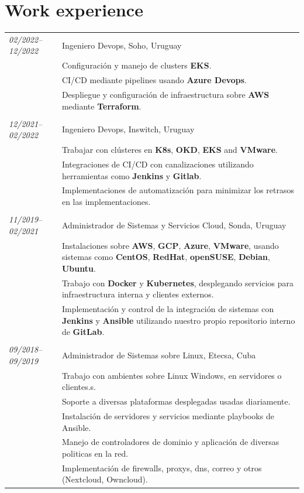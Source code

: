 \documentclass[a4paper,12pt]{article}
\begin{document}
\section{Work experience}
\justify
\begin{tabular}{p{2.9cm}| p{16cm}}
\emph{02/2022–12/2022} & Ingeniero Devops, Soho, Uruguay \\
\textsc{}&\footnotesize{Configuración y manejo de clusters \textbf{EKS}.}\\
\textsc{}&\footnotesize{CI/CD mediante pipelines usando \textbf{Azure Devops}.}\\
\textsc{}&\footnotesize{Despliegue y configuración de infraestructura sobre \textbf{AWS} mediante \textbf{Terraform}.}\\

\multicolumn{2}{c}{} \\  
\emph{12/2021–02/2022} & Ingeniero Devops, Inswitch, Uruguay \\
\textsc{}&\footnotesize{Trabajar con clústeres en \textbf{K8s}, \textbf{OKD}, \textbf{EKS} and \textbf{VMware}.}\\
\textsc{}&\footnotesize{Integraciones de CI/CD con canalizaciones utilizando herramientas como \textbf{Jenkins} y \textbf{Gitlab}.}\\
\textsc{}&\footnotesize{Implementaciones de automatización para minimizar los retrasos en las implementaciones.}\\

\multicolumn{2}{c}{} \\  
\emph{11/2019–02/2021} & Administrador de Sistemas y Servicios Cloud, Sonda, Uruguay \\
\textsc{}&\footnotesize{Instalaciones sobre \textbf{AWS}, \textbf{GCP}, \textbf{Azure}, \textbf{VMware}, usando sistemas como \textbf{CentOS}, \textbf{RedHat}, \textbf{openSUSE}, \textbf{Debian}, \textbf{Ubuntu}.}\\
\textsc{}&\footnotesize{Trabajo con \textbf{Docker} y \textbf{Kubernetes}, desplegando servicios para infraestructura interna y clientes externos.}\\
\textsc{}&\footnotesize{Implementación y control de la integración de sistemas con \textbf{Jenkins} y \textbf{Ansible} utilizando nuestro propio repositorio interno de \textbf{GitLab}.}\\

\multicolumn{2}{c}{} \\  
\emph{09/2018–09/2019} & Administrador de Sistemas sobre Linux, Etecsa, Cuba\\
\textsc{}&\footnotesize{Trabajo con ambientes sobre Linux Windows, en servidores o clientes.s.}\\
\textsc{}&\footnotesize{Soporte a diversas plataformas desplegadas usadas diariamente.}\\
\textsc{}&\footnotesize{Instalación de servidores y servicios mediante playbooks de Ansible.}\\
\textsc{}&\footnotesize{Manejo de controladores de dominio y aplicación de diversas politicas en la red.}\\
\textsc{}&\footnotesize{Implementaci\'on de firewalls, proxys, dns, correo y otros (Nextcloud, Owncloud).}\\


\end{tabular}
\end{document}
